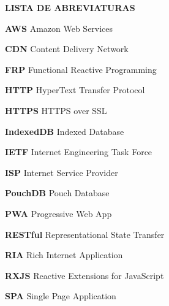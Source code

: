 \begin{center}
\textsc{\bfseries\uppercase{Lista de Abreviaturas}}
\end{center}

\textbf{AWS} Amazon Web Services

\textbf{CDN} Content Delivery Network

\textbf{FRP} Functional Reactive Programming

\textbf{HTTP} HyperText Transfer Protocol

\textbf{HTTPS} HTTPS over SSL

\textbf{IndexedDB} Indexed Database

\textbf{IETF} Internet Engineering Task Force

\textbf{ISP} Internet Service Provider

\textbf{PouchDB} Pouch Database

\textbf{PWA} Progressive Web App

\textbf{RESTful} Representational State Transfer

\textbf{RIA} Rich Internet Application

\textbf{RXJS} Reactive Extensions for JavaScript

\textbf{SPA} Single Page Application

\newpage
